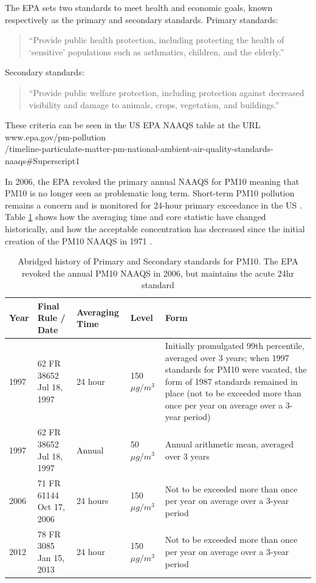 \documentclass{article}
\begin{document}
The \ac{EPA} sets two standards to meet health and economic goals, known respectively as the primary and secondary standards.  Primary standards:
\begin{quote}
    ``Provide public health protection, including protecting the health of `sensitive' populations such as asthmatics, children, and the elderly.'' 
\end{quote}
Secondary standards:
\begin{quote}
    ``Provide public welfare protection, including protection against decreased visibility and damage to animals, crops, vegetation, and buildings.''  %
\end{quote}
These criteria can be 
seen in the US EPA NAAQS table
at the URL\\
www.epa.gov/pm-pollution \\/timeline-particulate-matter-pm-national-ambient-air-quality-standards-naaqs\#Superscript1

In 2006, the EPA revoked the primary annual \ac{NAAQS} for \ac{PM10} meaning that \ac{PM10} is no longer seen as problematic long term.  Short-term \ac{PM10} pollution remains a concern and is monitored for 24-hour primary exceedance in the US 
.  Table \ref{tab:EPA_PM10_standards} shows how the averaging time and core statistic have changed historically, and how the acceptable concentration has decreased since the initial creation of the \ac{PM10} \ac{NAAQS} in 1971 
.
\begin{table}[ht]
    \centering
    \begin{tabular}{p{}|p{}|p{}|p{0.14%
    \textwidth}|p{}}
    Year & Final Rule / Date & Averaging Time & Level & Form \\
    \hline
    1997 & 62 FR 38652 Jul 18, 1997 & 24 hour & 150 $\mu g/m^3$ &	Initially promulgated 99th percentile, averaged over 3 years; when 1997 standards for PM10 were vacated, the form of 1987 standards remained in place (not to be exceeded more than once per year on average over a 3-year period) \\
    1997 & 62 FR 38652 Jul 18, 1997 & Annual & 50 $\mu g/m^3$ & Annual arithmetic mean, averaged over 3 years \\
    2006 & 71 FR 61144 Oct 17, 2006 & 24 hours & 150 $\mu g/m^3$ & Not to be exceeded more than once per year on average over a 3-year period \\
    2012 & 78 FR 3085 Jan 15, 2013 & 24 hour & 150 $\mu g/m^3$ & Not to be exceeded more than once per year on average over a 3-year period \\
    \end{tabular}
    \caption{Abridged history of Primary and Secondary standards for \ac{PM10}.  The \ac{EPA} revoked the annual \ac{PM10} \ac{NAAQS} in 2006, but maintains the acute 24hr standard 
    }
    \label{tab:EPA_PM10_standards}
\end{table}
\end{document}
